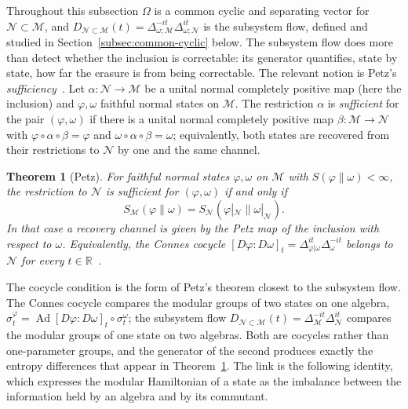 \documentclass[a4paper,11pt]{article}
\newtheorem{theorem}{Theorem}
\theoremstyle{definition}
\newcommand{\mN}{\mathcal{N}}
\newcommand{\mM}{\mathcal{M}}
\begin{document}
Throughout this subsection $\Omega$ is a common cyclic and separating vector for $\mN\subset\mM$, and $D_{\mN\subset\mM}(t)=\Delta_{\omega;\mM}^{-it}\Delta_{\omega;\mN}^{it}$ is the subsystem flow, defined and studied in Section~\ref{subsec:common-cyclic} below. The subsystem flow does more than detect whether the inclusion is correctable: its generator quantifies, state by state, how far the erasure is from being correctable. The relevant notion is Petz's \emph{sufficiency}~\cite{Petz1986,Petz1988,OhyaPetz1993}. Let $\alpha:\mN\to\mM$ be a unital normal completely positive map (here the inclusion) and $\varphi,\omega$ faithful normal states on $\mM$. The restriction $\alpha$ is \emph{sufficient} for the pair $(\varphi,\omega)$ if there is a unital normal completely positive map $\beta:\mM\to\mN$ with $\varphi\circ\alpha\circ\beta=\varphi$ and $\omega\circ\alpha\circ\beta=\omega$; equivalently, both states are recovered from their restrictions to $\mN$ by one and the same channel.

\begin{theorem}[Petz]\label{thm:Petz}
For faithful normal states $\varphi,\omega$ on $\mM$ with $S(\varphi\|\omega)<\infty$, the restriction to $\mN$ is sufficient for $(\varphi,\omega)$ if and only if
\[
 S_{\mM}(\varphi\|\omega)=S_{\mN}(\varphi|_{\mN}\|\omega|_{\mN}) .
\]
In that case a recovery channel is given by the Petz map of the inclusion with respect to $\omega$. Equivalently, the Connes cocycle $[D\varphi:D\omega]_t=\Delta_{\varphi|\omega}^{it}\Delta_{\omega}^{-it}$ belongs to $\mN$ for every $t\in\mathbb R$~\cite{Petz1988,JencovaPetz2006}.
\end{theorem}

The cocycle condition is the form of Petz's theorem closest to the subsystem flow. The Connes cocycle compares the modular groups of two states on one algebra, $\sigma^{\varphi}_t=\operatorname{Ad}[D\varphi:D\omega]_t\circ\sigma^{\omega}_t$; the subsystem flow $D_{\mN\subset\mM}(t)=\Delta_{\mM}^{-it}\Delta_{\mN}^{it}$ compares the modular groups of one state on two algebras. Both are cocycles rather than one-parameter groups, and the generator of the second produces exactly the entropy differences that appear in Theorem~\ref{thm:Petz}. The link is the following identity, which expresses the modular Hamiltonian of a state as the imbalance between the information held by an algebra and by its commutant.
\end{document}
